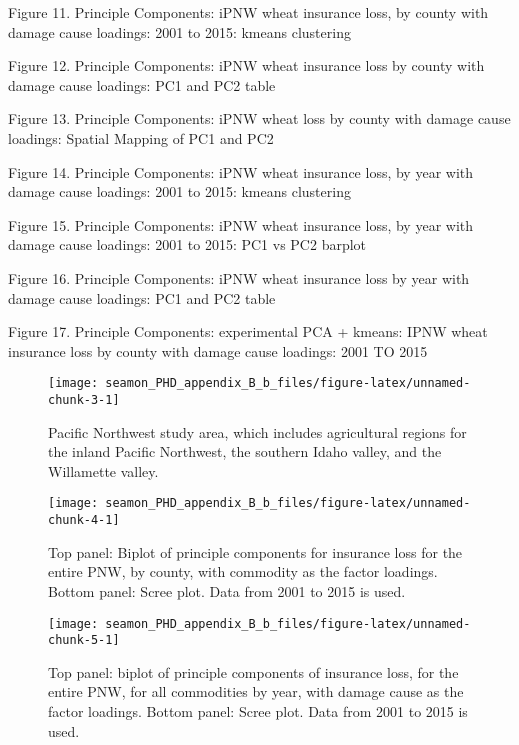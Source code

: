 \documentclass[]{article}
\begin{document}
Figure 11. Principle Components: iPNW wheat insurance loss, by county
with damage cause loadings: 2001 to 2015: kmeans clustering

Figure 12. Principle Components: iPNW wheat insurance loss by county
with damage cause loadings: PC1 and PC2 table

Figure 13. Principle Components: iPNW wheat loss by county with damage
cause loadings: Spatial Mapping of PC1 and PC2

Figure 14. Principle Components: iPNW wheat insurance loss, by year with
damage cause loadings: 2001 to 2015: kmeans clustering

Figure 15. Principle Components: iPNW wheat insurance loss, by year with
damage cause loadings: 2001 to 2015: PC1 vs PC2 barplot

Figure 16. Principle Components: iPNW wheat insurance loss by year with
damage cause loadings: PC1 and PC2 table

Figure 17. Principle Components: experimental PCA + kmeans: IPNW wheat
insurance loss by county with damage cause loadings: 2001 TO 2015

\begin{figure}

{\centering \texttt{[image: seamon\_PHD\_appendix\_B\_b\_files/figure-latex/unnamed-chunk-3-1]} 

}

\caption{Pacific Northwest study area, which includes agricultural regions for the inland Pacific Northwest, the southern Idaho valley, and the Willamette valley.}\label{fig:unnamed-chunk-3}
\end{figure}
\newpage
\begin{figure}

{\centering \texttt{[image: seamon\_PHD\_appendix\_B\_b\_files/figure-latex/unnamed-chunk-4-1]} 

}

\caption{Top panel: Biplot of principle components for insurance loss for the entire PNW, by county, with commodity as the factor loadings. Bottom panel: Scree plot. Data from 2001 to 2015 is used.}\label{fig:unnamed-chunk-4}
\end{figure}
\newpage

\begin{figure}

{\centering \texttt{[image: seamon\_PHD\_appendix\_B\_b\_files/figure-latex/unnamed-chunk-5-1]} 

}

\caption{Top panel: biplot of principle components of insurance loss, for the entire PNW, for all commodities by year, with damage cause as the factor loadings. Bottom panel: Scree plot. Data from 2001 to 2015 is used.}\label{fig:unnamed-chunk-5}
\end{figure}
\newpage
\end{document}
